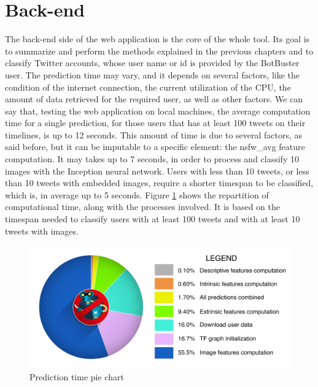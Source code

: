 \section{Back-end}
The back-end side of the web application is the core of the whole tool. Its goal is to summarize and perform the methods explained in the previous chapters and to classify Twitter accounts, whose user name or id is provided by the BotBuster user.
The prediction time may vary, and it depends on several factors, like the condition of the internet connection, the current utilization of the CPU, the amount of data retrieved for the required user, as well as other factors.
We can say that, testing the web application on local machines, the average computation time for a single prediction, for those users that has at least 100 tweets on their timelines, is up to 12 seconds. This amount of time is due to several factors, as said before, but it can be imputable to a specific element: the nsfw\_avg feature computation. It may takes up to 7 seconds, in order to process and classify 10 images with the Inception neural network. Users with less than 10 tweets, or less than 10 tweets with embedded images, require a shorter timespan to be classified, which is, in average up to 5 seconds. Figure \ref{fig:pie} shows the repartition of computational time, along with the processes involved. It is based on the timespan needed to classify users with at least 100 tweets and with at least 10 tweets with images.

\begin{figure}[htp!]
	\begin{center}
		\includegraphics[width=\columnwidth]{chapter7/figure/time-pie.png}
	\end{center}
	\caption{Prediction time pie chart}
	\label{fig:pie}
\end{figure}

